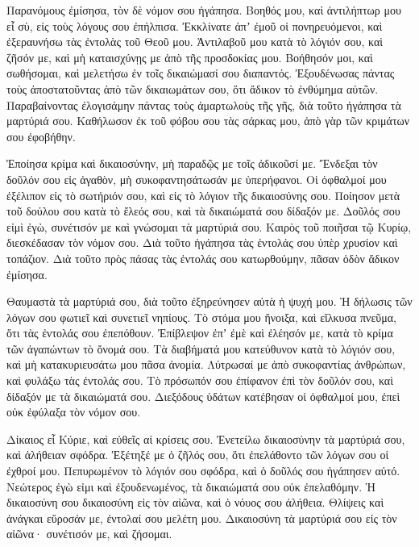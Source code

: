 \begin{spacing}{1.1}
\begin{multicols}{2}
Παρανόμους ἐμίσησα, τὸν δὲ νόμον σου ἠγάπησα.
Βοηθός μου, καὶ ἀντιλήπτωρ μου εἶ σὺ, εἰς τοὺς λόγους σου ἐπήλπισα.
Ἐκκλίνατε ἀπʼ ἐμοῦ οἱ πονηρευόμενοι, καὶ ἐξεραυνήσω τὰς ἐντολὰς τοῦ Θεοῦ μου.
Ἀντιλαβοῦ μου κατὰ τὸ λόγιόν σου, καὶ ζῆσόν με, καὶ μὴ καταισχύνῃς με ἀπὸ τῆς προσδοκίας μου.
Βοήθησόν μοι, καὶ σωθήσομαι, καὶ μελετήσω ἐν τοῖς δικαιώμασί σου διαπαντός.
Ἐξουδένωσας πάντας τοὺς ἀποστατοῦντας ἀπὸ τῶν δικαιωμάτων σου, ὅτι ἄδικον τὸ ἐνθύμημα αὐτῶν.
Παραβαίνοντας ἐλογισάμην πάντας τοὺς ἁμαρτωλοὺς τῆς γῆς, διὰ τοῦτο ἠγάπησα τὰ μαρτύριά σου.
Καθήλωσον ἐκ τοῦ φόβου σου τὰς σάρκας μου, ἀπὸ γὰρ τῶν κριμάτων σου ἐφοβήθην.

Ἐποίησα κρίμα καὶ δικαιοσύνην, μὴ παραδῷς με τοῖς ἀδικοῦσί με.
Ἔνδεξαι τὸν δοῦλόν σου εἰς ἀγαθὸν, μὴ συκοφαντησάτωσάν με ὑπερήφανοι.
Οἱ ὀφθαλμοί μου ἐξέλιπον εἰς τὸ σωτήριόν σου, καὶ εἰς τὸ λόγιον τῆς δικαιοσύνης σου.
Ποίησον μετὰ τοῦ δούλου σου κατὰ τὸ ἔλεός σου, καὶ τὰ δικαιώματά σου δίδαξόν με.
Δοῦλός σου εἰμὶ ἐγὼ, συνέτισόν με καὶ γνώσομαι τὰ μαρτύριά σου.
Καιρὸς τοῦ ποιῆσαι τῷ Κυρίῳ, διεσκέδασαν τὸν νόμον σου.
Διὰ τοῦτο ἠγάπησα τὰς ἐντολάς σου ὑπὲρ χρυσίον καὶ τοπάζιον.
Διὰ τοῦτο πρὸς πάσας τὰς ἐντολάς σου κατωρθούμην, πᾶσαν ὁδὸν ἄδικον ἐμίσησα.

Θαυμαστὰ τὰ μαρτύριά σου, διὰ τοῦτο ἐξηρεύνησεν αὐτὰ ἡ ψυχή μου.
Ἡ δήλωσις τῶν λόγων σου φωτιεῖ καὶ συνετιεῖ νηπίους.
Τὸ στόμα μου ἤνοιξα, καὶ εἵλκυσα πνεῦμα, ὅτι τὰς ἐντολάς σου ἐπεπόθουν.
Ἐπίβλεψον ἐπʼ ἐμὲ καὶ ἐλέησόν με, κατὰ τὸ κρίμα τῶν ἀγαπώντων τὸ ὄνομά σου.
Τὰ διαβήματά μου κατεύθυνον κατὰ τὸ λόγιόν σου, καὶ μὴ κατακυριευσάτω μου πᾶσα ἀνομία.
Λύτρωσαί με ἀπὸ συκοφαντίας ἀνθρώπων, καὶ φυλάξω τὰς ἐντολάς σου.
Τὸ πρόσωπόν σου ἐπίφανον ἐπὶ τὸν δοῦλόν σου, καὶ δίδαξόν με τὰ δικαιώματά σου.
Διεξόδους ὑδάτων κατέβησαν οἱ ὀφθαλμοί μου, ἐπεὶ οὐκ ἐφύλαξα τὸν νόμον σου.

Δίκαιος εἶ Κύριε, καὶ εὐθεῖς αἱ κρίσεις σου.
Ἐνετείλω δικαιοσύνην τὰ μαρτύριά σου, καὶ ἀλήθειαν σφόδρα.
Ἐξέτηξέ με ὁ ζῆλός σου, ὅτι ἐπελάθοντο τῶν λόγων σου οἱ ἐχθροί μου.
Πεπυρωμένον τὸ λόγιόν σου σφόδρα, καὶ ὁ δοῦλός σου ἠγάπησεν αὐτό.
Νεώτερος ἐγὼ εἰμι καὶ ἐξουδενωμένος, τὰ δικαιώματά σου οὐκ ἐπελαθόμην.
Ἡ δικαιοσύνη σου δικαιοσύνη εἰς τὸν αἰῶνα, καὶ ὁ νόυος σου ἀλήθεια.
Θλίψεις καὶ ἀνάγκαι εὕροσάν με, ἐντολαί σου μελέτη μου.
Δικαιοσύνη τὰ μαρτύριά σου εἰς τὸν αἰῶνα· συνέτισόν με, καὶ ζήσομαι.


\end{multicols}
\end{spacing}
